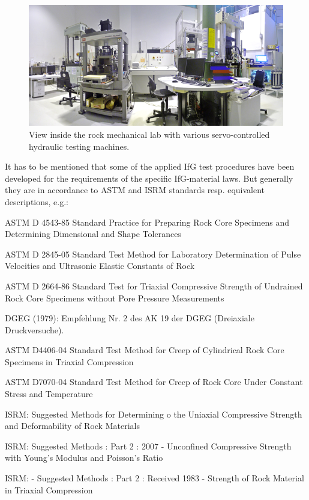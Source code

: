 \begin{figure}[!ht]
\centering
\includegraphics[width=1\textwidth]{./figures/ifg-lab-photo1-v2.png}
\caption{View inside the rock mechanical lab with various servo-controlled hydraulic testing machines.}
\label{fig:ifglabph1}
\end{figure}

It has to be mentioned that some of the applied IfG test procedures have been developed for the requirements of the specific IfG-material laws. 
But generally they are in accordance to ASTM and ISRM standards resp. equivalent descriptions, e.g.:

\begin{list}{-}{\leftmargin=1em \itemindent=0em \itemsep=0.1em}
\item ASTM D 4543-85 Standard Practice for Preparing Rock Core Specimens and Determining Dimensional and Shape Tolerances
\item ASTM D 2845-05 Standard Test Method for Laboratory Determination of Pulse Velocities and Ultrasonic Elastic Constants of Rock
\item ASTM D 2664-86 Standard Test for Triaxial Compressive Strength of Un\-drained Rock Core Specimens without Pore Pressure Measurements 
\item DGEG (1979):   Empfehlung Nr. 2 des AK 19 der DGEG (Dreiaxiale Druckversuche).
\item ASTM D4406-04 Standard Test Method for Creep of Cylindrical Rock Core Specimens in Triaxial Compression
\item ASTM D7070-04 Standard Test Method for Creep of Rock Core Under Constant Stress and Temperature
\item ISRM: Suggested Methods for Determining o the Uniaxial Compressive Strength and Deformability of Rock Materials
\item ISRM: Suggested Methods : Part 2 : 2007 - Unconfined Compressive Strength with Young's Modulus and Poisson's Ratio
\item ISRM: - Suggested Methods : Part 2 : Received 1983 - Strength of Rock Material in Triaxial Compression
\end{list}

